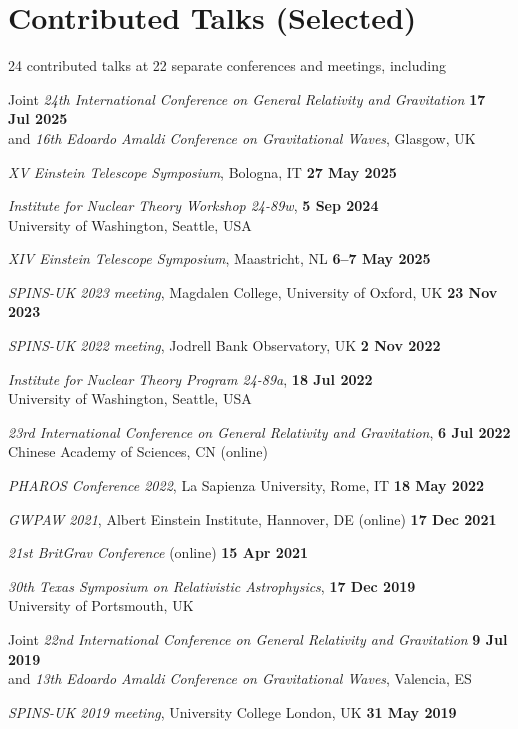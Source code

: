 \section{Contributed Talks (Selected)}

24 contributed talks at 22 separate conferences and meetings, including
%
\begin{etaremune}
    \item Joint \textit{24th International Conference on General Relativity and
    Gravitation} \hfill \textbf{17 Jul 2025} \\
    and \textit{16th Edoardo Amaldi Conference on Gravitational Waves}, Glasgow, UK
    \item \textit{XV Einstein Telescope Symposium}, Bologna, IT
    \hfill \textbf{27 May 2025}
    \item \textit{Institute for Nuclear Theory Workshop 24-89w},
    \hfill \textbf{5 Sep 2024} \\
    University of Washington, Seattle, USA
    \item \textit{XIV Einstein Telescope Symposium}, Maastricht, NL
    \hfill \textbf{6--7 May 2025}
    \item \textit{SPINS-UK 2023 meeting}, 
    Magdalen College, University of Oxford, UK \hfill \textbf{23 Nov 2023}
    \item \textit{SPINS-UK 2022 meeting}, Jodrell Bank Observatory, UK
    \hfill \textbf{2 Nov 2022}
    \item \textit{Institute for Nuclear Theory Program 24-89a},
    \hfill \textbf{18 Jul 2022} \\
    University of Washington, Seattle, USA
    \item \textit{23rd International Conference on General Relativity and
    Gravitation}, \hfill \textbf{6 Jul 2022} \\
    Chinese Academy of Sciences, CN (online)
    \item \textit{PHAROS Conference 2022}, La Sapienza University, Rome, IT
    \hfill \textbf{18 May 2022}
    \item \textit{GWPAW 2021}, Albert Einstein Institute, Hannover, DE (online)
    \hfill \textbf{17 Dec 2021}
    \item \textit{21st BritGrav Conference} (online)
    \hfill \textbf{15 Apr 2021}
    \item \textit{30th Texas Symposium on Relativistic Astrophysics},
    \hfill \textbf{17 Dec 2019} \\
    University of Portsmouth, UK
    \item Joint \textit{22nd International Conference on General Relativity and
    Gravitation} \hfill \textbf{9 Jul 2019} \\
    and \textit{13th Edoardo Amaldi Conference on Gravitational Waves},
    Valencia, ES
    \item \textit{SPINS-UK 2019 meeting}, University College London, UK
    \hfill \textbf{31 May 2019}
\end{etaremune}


